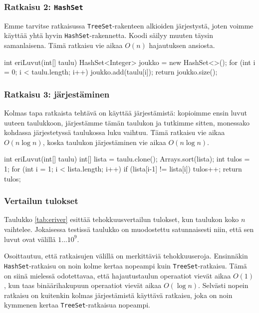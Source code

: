 \subsubsection{Ratkaisu 2: \texttt{HashSet}}

Emme tarvitse ratkaisussa \texttt{TreeSet}-rakenteen
alkioiden järjestystä, joten voimme käyttää
yhtä hyvin \texttt{HashSet}-rakennetta.
Koodi säilyy muuten täysin samanlaisena.
Tämä ratkaisu vie aikaa $O(n)$ hajautuksen ansiosta.

\begin{code}
int eriLuvut(int[] taulu) {
    HashSet<Integer> joukko = new HashSet<>();
    for (int i = 0; i < taulu.length; i++) {
        joukko.add(taulu[i]);
    }
    return joukko.size();
}
\end{code}

\subsubsection{Ratkaisu 3: järjestäminen}

Kolmas tapa ratkaista tehtävä on käyttää järjestämistä:
kopioimme ensin luvut uuteen taulukkoon, järjestämme tämän taulukon ja
tutkimme sitten, monessako kohdassa järjestetyssä taulukossa luku vaihtuu.
Tämä ratkaisu vie aikaa $O(n \log n)$, koska taulukon järjestäminen
vie aikaa $O(n \log n)$.

\begin{code}
int eriLuvut(int[] taulu) {
    int[] lista = taulu.clone();
    Arrays.sort(lista);
    int tulos = 1;
    for (int i = 1; i < lista.length; i++) {
        if (lista[i-1] != lista[i]) tulos++;
    }
    return tulos;
}
\end{code}

\subsubsection{Vertailun tulokset}

Taulukko \ref{tab:eriver} esittää tehokkuusvertailun tulokset,
kun taulukon koko $n$ vaihtelee.
Jokaisessa testissä taulukko on muodostettu satunnaisesti niin,
että sen luvut ovat välillä $1 \dots 10^9$.

Osoittautuu, että ratkaisujen välillä on merkittäviä tehokkuuseroja.
Ensinnäkin \texttt{HashSet}-ratkaisu on noin kolme kertaa
nopeampi kuin \texttt{TreeSet}-ratkaisu.
Tämä on siinä mielessä odotettavaa, että hajautustaulun
operaatiot vievät aikaa $O(1)$, kun taas binäärihakupuun
operaatiot vievät aikaa $O(\log n)$.
Selvästi nopein ratkaisu on kuitenkin kolmas järjestämistä
käyttävä ratkaisu, joka on noin kymmenen kertaa
\texttt{TreeSet}-ratkaisua nopeampi.

